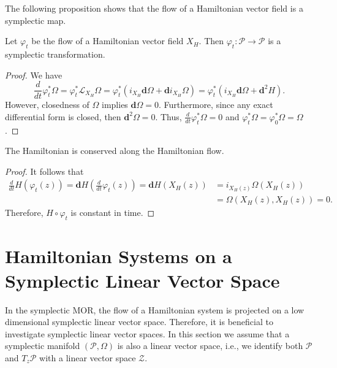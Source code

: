 The following proposition shows that the flow of a Hamiltonian vector field is a symplectic map.
\begin{proposition} \label{theorem:2.9}
Let $\varphi_t$ be the flow of a Hamiltonian vector field $X_H$. Then $\varphi_t:\mathcal P \to \mathcal P$ is a symplectic transformation.
\end{proposition}
\begin{proof}
We have
\begin{equation*}
	\frac{d}{dt} \varphi_t^* \Omega = \varphi_t^* \mathcal L_{X_H} \Omega = \varphi_t^*( i_{X_H} \mathbf d \Omega + \mathbf d i_{X_H} \Omega ) =  \varphi_t^*( i_{X_H} \mathbf d \Omega + \mathbf d^2 H ).
\end{equation*}
However, closedness of $\Omega$ implies $\mathbf d \Omega = 0$. Furthermore, since any exact differential form is closed, then $\mathbf d^2 \Omega = 0$. Thus, $\frac{d}{dt} \varphi_t^* \Omega = 0$ and $\varphi_t^* \Omega = \varphi_0^* \Omega = \Omega$.
\end{proof}
\begin{corollary} \label{theorem:2.10}
The Hamiltonian is conserved along the Hamiltonian flow.
\end{corollary}
\begin{proof}
It follows that
\begin{equation*}
\begin{aligned}
	\frac{d}{dt} H(\varphi_t(z)) = \mathbf dH\left( \frac{d}{dt} \varphi_t(z) \right) = \mathbf dH \left( X_H(z) \right) &= i_{X_H(z)} \Omega(X_H(z))\\
	& = \Omega(X_H(z),X_H(z)) = 0.
\end{aligned}
\end{equation*}
Therefore, $H\circ \varphi_t$ is constant in time.
\end{proof}

\section{Hamiltonian Systems on a Symplectic Linear Vector Space} \label{section:2.4}
In the symplectic MOR, the flow of a Hamiltonian system is projected on a low dimensional symplectic linear vector space. Therefore, it is beneficial to investigate symplectic linear vector spaces. In this section we assume that a symplectic manifold $(\mathcal P, \Omega)$ is also a linear vector space, i.e., we identify both $\mathcal P$ and $T_z \mathcal P$ with a linear vector space $\mathcal Z$.

